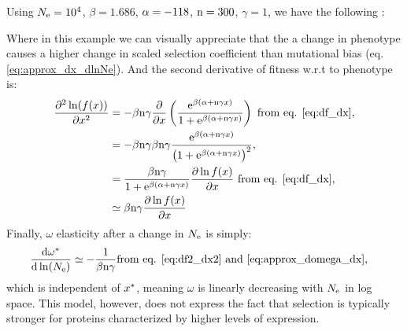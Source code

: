 \documentclass{article}
\begin{document}
Using $N_{\mathrm{e}}=10^4$, $\beta=1.686$, $\alpha = -118$, $\text{n}=300$, $\gamma=1$, we have the following :
\begin{center}
\end{center}
Where in this example we can visually appreciate that the a change in phenotype causes a higher change in scaled selection coefficient than mutational bias (eq. \ref{eq:approx_dx_dlnNe}).
And the second derivative of fitness w.r.t to phenotype is:
\begin{align}
\frac{\partial^2 \ln (f(x))}{\partial x^2} & = - \beta \text{n} \gamma \frac{\partial}{\partial x} \left( \frac{\mathrm{e}^{\beta(\alpha + \text{n} \gamma x)}}{1 + \mathrm{e}^{\beta(\alpha + \text{n} \gamma x)}} \right) \text{ from eq. \ref{eq:df_dx}}, \\
 & = - \beta \text{n} \gamma  \beta \text{n} \gamma \frac{\mathrm{e}^{\beta(\alpha + \text{n} \gamma x)}}{\left( 1 + \mathrm{e}^{\beta(\alpha + \text{n} \gamma x)}\right)^2}, \\
 & = \frac{\beta \text{n} \gamma}{1 + \mathrm{e}^{\beta(\alpha + \text{n} \gamma x)}} \frac{ \partial \ln f(x) }{\partial x} \text{ from eq. \ref{eq:df_dx}} \label{eq:df2_dx2}, \\
 & \simeq \beta \text{n} \gamma \frac{ \partial \ln f(x) }{\partial x} 
\end{align}
Finally, $\omega$ elasticity after a change in $N_{\mathrm{e}}$ is simply:
\begin{align}
\frac{ \mathrm{d} \omega^{*}}{\mathrm{d} \ln (N_{\mathrm{e}})} & \simeq - \frac{1}{\beta \text{n} \gamma} \text{from eq. \ref{eq:df2_dx2} and \ref{eq:approx_domega_dx}},
\end{align}
which is independent of $x^{*}$, meaning $\omega$ is linearly decreasing with $N_{\mathrm{e}}$ in log space.
This model, however, does not express the fact that selection is typically stronger for proteins characterized by higher levels of expression. 
\end{document}

